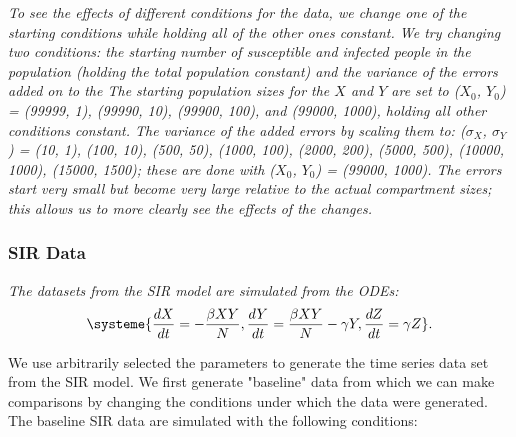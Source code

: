 \documentclass[12pt]{article}
\begin{document}



\textit{To see the effects of different conditions for the data, we change one of the starting conditions while holding all of the other ones constant. We try changing two conditions: the starting number of susceptible and infected people in the population (holding the total population constant) and the variance of the errors added on to the The starting population sizes for the $X$ and $Y$ are set to ($X_0$, $Y_0$) =  (99999, 1), (99990, 10), (99900, 100), and (99000, 1000), holding all other conditions constant. The variance of the added errors by scaling them to: ($\sigma_X$, $\sigma_Y$) = (10, 1), (100, 10), (500, 50), (1000, 100), (2000, 200), (5000, 500), (10000, 1000), (15000, 1500); these are done with ($X_0$, $Y_0$) = (99000, 1000). The errors start very small but become very large relative to the actual compartment sizes; this allows us to more clearly see the effects of the changes.}







\subsubsection{SIR Data}

\textit{The datasets from the SIR model are simulated from the ODEs: \begin{align}
	\systeme{\frac{dX}{dt} = -\frac{\beta XY}{N}, \frac{dY}{dt} = \frac{\beta XY}{N} - \gamma Y, \frac{dZ}{dt} = \gamma Z}.
	\end{align}
} 

We use arbitrarily selected the parameters to generate the time series data set from the SIR model. We first generate "baseline" data from which we can make comparisons by changing the  conditions under which the data were generated. The baseline SIR data are simulated with the following conditions:
\end{document}
